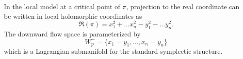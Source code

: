 

    In the local model at a critical point of $\pi$, projection to the real coordinate can be written in local holomorphic coordinates as 
    \[\Re(\pi)=x_1^2+\ldots x_n^2-y_1^2-\ldots y_n^2.\]
    The downward flow space is parameterized by 
    \[W^-_p=\{x_1=y_1, \ldots, x_n=y_n\}\]
    which is a Lagrangian submanifold for the standard symplectic structure. 

